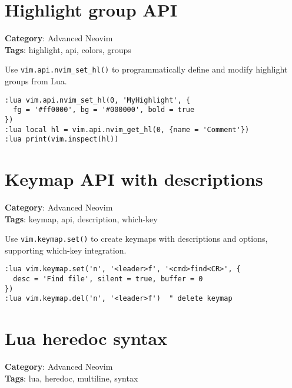 \section{Highlight group API}

\textbf{Category}: Advanced Neovim\\ \textbf{Tags}: highlight, api, colors, groups
\vspace{0.5cm}

Use {\footnotesize \Verb§vim.api.nvim_set_hl()§} to programmatically define and modify highlight groups from Lua.

\begin{Exa*}{}
\begin{Verbatim}[fontsize=\footnotesize, breaklines, breakanywhere]
:lua vim.api.nvim_set_hl(0, 'MyHighlight', {
  fg = '#ff0000', bg = '#000000', bold = true
})
:lua local hl = vim.api.nvim_get_hl(0, {name = 'Comment'})
:lua print(vim.inspect(hl))
\end{Verbatim}
\end{Exa*}

\section{Keymap API with descriptions}

\textbf{Category}: Advanced Neovim\\ \textbf{Tags}: keymap, api, description, which-key
\vspace{0.5cm}

Use {\footnotesize \Verb§vim.keymap.set()§} to create keymaps with descriptions and options, supporting which-key integration.

\begin{Exa*}{}
\begin{Verbatim}[fontsize=\footnotesize, breaklines, breakanywhere]
:lua vim.keymap.set('n', '<leader>f', '<cmd>find<CR>', {
  desc = 'Find file', silent = true, buffer = 0
})
:lua vim.keymap.del('n', '<leader>f')  " delete keymap
\end{Verbatim}
\end{Exa*}

\section{Lua heredoc syntax}

\textbf{Category}: Advanced Neovim\\ \textbf{Tags}: lua, heredoc, multiline, syntax
\vspace{0.5cm}

